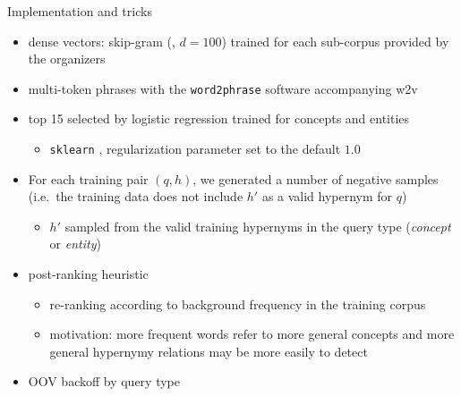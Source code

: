\documentclass{beamer}
\newlength{\onecolwid}
\newcommand{\bull}[1]{
  \begin{itemize}
    \item #1
  \end{itemize}
}
\begin{document}
\begin{frame}[t]
\begin{columns}[t]
\begin{column}{\onecolwid}



  \begin{block}{Implementation and tricks}
    \begin{itemize}
      \item \alert{dense vectors}: skip-gram (\cite{Mikolov:2013f}, $d=100$) trained
        for each sub-corpus provided by the organizers 
      \item multi-token \alert{phrases} with the \texttt{word2phrase}
        software accompanying w2v
      \item top 15 selected by \alert{logistic regression} trained for concepts
        and entities 
        \bull{\texttt{sklearn}
        \citep{Pedregosa:2011},%
        regularization parameter set to the default $1.0$}

      \item For each training pair $(q,h)$, we generated a number of \alert{negative
        samples} (i.e.~the training data does not include $h'$ as a valid hypernym for
        $q$)
        \bull{$h'$ sampled from the valid training hypernyms in  the query type
        (\textit{concept} or \textit{entity})}

      \item \alert{post-ranking} heuristic
        \begin{itemize}
          \item re-ranking according to background frequency in the training corpus
          \item motivation: more frequent words refer to more general concepts
            and more general hypernymy relations may be more easily to detect
        \end{itemize}
      \item {OOV backoff by query type}

  \end{itemize}
\end{block}


\end{column}
\end{columns}
\end{frame}
\end{document}
